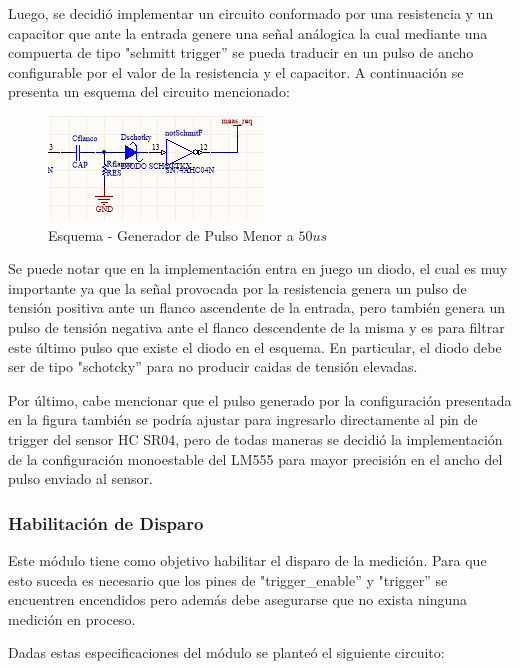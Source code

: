 Luego, se decidió implementar un circuito conformado por una resistencia
y un capacitor que ante la entrada genere una señal análogica la cual
mediante una compuerta de tipo "schmitt trigger'' se pueda traducir
en un pulso de ancho configurable por el valor de la resistencia y
el capacitor. A continuación se presenta un esquema del circuito mencionado:

\begin{figure}[H]
\begin{centering}
\includegraphics[scale=1]{generadorDePulsoMenor50us.PNG}
\par\end{centering}
\caption{Esquema - Generador de Pulso Menor a $50us$}
\end{figure}

Se puede notar que en la implementación entra en juego un diodo, el
cual es muy importante ya que la señal provocada por la resistencia
genera un pulso de tensión positiva ante un flanco ascendente de la
entrada, pero también genera un pulso de tensión negativa ante el
flanco descendente de la misma y es para filtrar este último pulso
que existe el diodo en el esquema. En particular, el diodo debe ser
de tipo "schotcky'' para no producir caidas de tensión elevadas.

Por último, cabe mencionar que el pulso generado por la configuración
presentada en la figura también se podría ajustar para ingresarlo
directamente al pin de trigger del sensor HC SR04, pero de todas maneras
se decidió la implementación de la configuración monoestable del LM555
para mayor precisión en el ancho del pulso enviado al sensor.

\subsubsection{Habilitación de Disparo}

Este módulo tiene como objetivo habilitar el disparo de la medición.
Para que esto suceda es necesario que los pines de "trigger\_enable''
y "trigger'' se encuentren encendidos pero además debe asegurarse
que no exista ninguna medición en proceso.

Dadas estas especificaciones del módulo se planteó el siguiente circuito:

